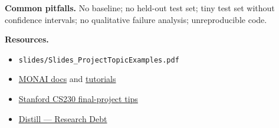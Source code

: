 \documentclass[11pt,a4paper]{article}
\begin{document}
\textbf{Common pitfalls.} No baseline; no held-out test set; tiny test
set without confidence intervals; no qualitative failure analysis;
unreproducible code.

\textbf{Resources.}
\begin{itemize}[leftmargin=*,nosep]
  \item \texttt{slides/Slides\_ProjectTopicExamples.pdf}
  \item \href{https://docs.monai.io/}{MONAI docs} and \href{https://github.com/Project-MONAI/tutorials}{tutorials}
  \item \href{https://cs230.stanford.edu/blog/finalproject/}{Stanford CS230 final-project tips}
  \item \href{https://distill.pub/2017/research-debt/}{Distill --- Research Debt}
\end{itemize}
\end{document}
